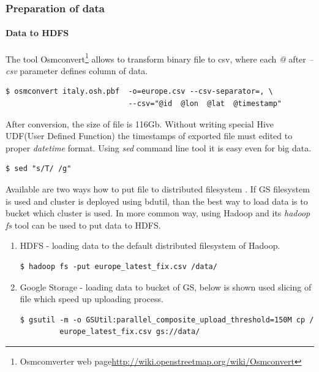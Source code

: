 \documentclass[a4paper,12pt,oneside]{report}
\begin{document}
	
\subsubsection{Preparation of data}
\paragraph{Data to HDFS}
	 The tool Osmconvert\footnote{Osmcomverter web
	page\url{http://wiki.openstreetmap.org/wiki/Osmconvert}} allows to transform
	binary file to csv,  where each 	\textit{@} after \textit{--csv} parameter
	defines column of data.
	\begin{footnotesize}
		\begin{lstlisting}[style=python]
$ osmconvert italy.osh.pbf  -o=europe.csv --csv-separator=, \
                            --csv="@id  @lon  @lat  @timestamp"
		\end{lstlisting}
	\end{footnotesize}
	 After conversion, the size of file is 116Gb. Without writing special Hive
	UDF(User Defined Function) the timestamps of exported file must edited to proper
	\textit{datetime} format. Using \textit{sed} command line tool it is easy even
	for big data.
	\begin{footnotesize}
		\begin{lstlisting}[style=python]
$ sed "s/T/ /g"
		\end{lstlisting}
	\end{footnotesize}
	 	Available are two ways how to put file to distributed filesystem . If GS
	filesystem is used and cluster is deployed using bdutil, than the best way to
	load data is to bucket which cluster is used. 
	In more common way, using Hadoop and
	its \textit{hadoop fs} tool can be used to put data to HDFS.
\begin{enumerate}
\item HDFS  - loading data to the default distributed filesystem of Hadoop.
	\begin{footnotesize}
		\begin{lstlisting}[style=python]
$ hadoop fs -put europe_latest_fix.csv /data/
		\end{lstlisting}
	\end{footnotesize}
\item Google Storage - loading data to bucket of GS, below is shown used slicing of
file which speed up uploading process.
	\begin{footnotesize}
		\begin{lstlisting}[style=python]
$ gsutil -m -o GSUtil:parallel_composite_upload_threshold=150M cp /
		 europe_latest_fix.csv gs://data/
		\end{lstlisting}
	\end{footnotesize}
\end{enumerate}
\end{document}
